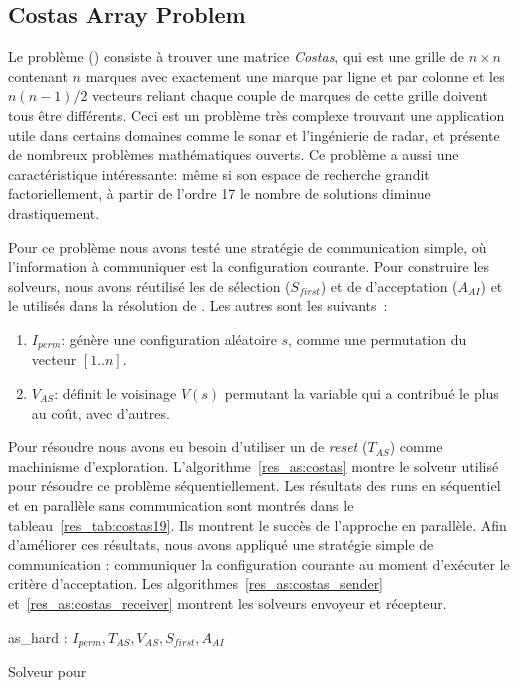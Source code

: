 \subsection{Costas Array Problem}

Le problème \carr{} (\CARRP) consiste à trouver une matrice {\it Costas}, qui est une grille de $n \times n$ contenant $n$ marques avec exactement une marque par ligne et par colonne et les $n(n-1)/2 $ vecteurs reliant chaque couple de marques de cette grille doivent tous être différents. Ceci est un problème très complexe trouvant une application utile dans certains domaines comme le sonar et l'ingénierie de radar, et présente de nombreux problèmes mathématiques ouverts. Ce problème a aussi une caractéristique intéressante: même si son espace de recherche grandit factoriellement, à partir de l'ordre 17 le nombre de solutions diminue drastiquement.

Pour ce problème nous avons testé une stratégie de communication simple, où l'information à communiquer est la configuration courante. Pour construire les solveurs, nous avons réutilisé les \oms{} de sélection ($S_{first}$) et de d'acceptation ($A_{AI}$) et le \opch{} utilisés dans la résolution de \SGP{}. Les autres \oms{} sont les suivants~:

\begin{enumerate}
	\item $I_{perm}$: génère une configuration aléatoire $s$, comme une permutation du vecteur $[1..n]$. 
	\item $V_{AS}$: définit le voisinage $V \left(s\right)$ permutant la variable qui a contribué le plus au coût, avec d'autres.
\end{enumerate}

Pour résoudre \CARRP{} nous avons eu besoin d'utiliser un \om{} de \textit{reset} ($T_{AS}$) comme machinisme d'exploration. L'algorithme~\ref{res_as:costas} montre le solveur utilisé pour résoudre ce problème séquentiellement. Les résultats des runs en séquentiel et en parallèle sans communication sont montrés dans le tableau~\ref{res_tab:costas19}. Ils montrent le succès de l'approche en parallèle. Afin d'améliorer ces résultats, nous avons appliqué une stratégie simple de communication : communiquer la configuration courante au moment d'exécuter le critère d'acceptation. Les algorithmes~\ref{res_as:costas_sender} et~\ref{res_as:costas_receiver} montrent les solveurs envoyeur et récepteur.

\begin{algorithm}[!h]
\dontprintsemicolon
\SetNoline
{}
   as\_hard\;
\algoindent{} : $I_{perm}, T_{AS}, V_{AS}, S_{first}, A_{AI}$ \;
\caption{Solveur pour \CARRP}\label{res_as:costas}
\end{algorithm}

